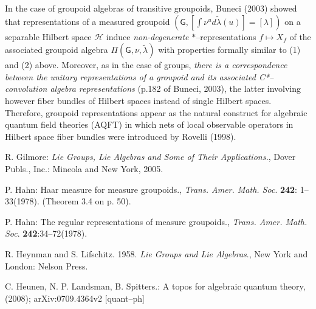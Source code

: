 \documentclass[12pt]{article}
\theoremstyle{plain}
\theoremstyle{definition}
\numberwithin{equation}{section}
\renewcommand{\H}{\mathcal H}
\newcommand{\grp}{{\mathsf{G}}}
\newcommand{\<}{{\langle}}
\begin{document}
 In the case of groupoid algebras of transitive groupoids, Buneci
(2003) showed that representations of a measured groupoid
$({\grp, [\int \nu ^u d \tilde{ \lambda}(u)]=[\lambda]})$ on a
separable Hilbert space $\H$ induce  \textit{non-degenerate}
$*$--representations  $f \mapsto  X_f$ of the associated groupoid
algebra $ \Pi (\grp, \nu,\tilde{\lambda})$ with properties
formally similar to (1) and (2) above.  Moreover, as in the case
of groups, \textit{there is a correspondence between the unitary
representations of a groupoid and its associated C*--convolution
algebra representations} (p.182 of Buneci, 2003), the latter
involving however fiber bundles of Hilbert spaces instead of
single Hilbert spaces. Therefore, groupoid representations appear
as the natural construct for algebraic quantum field theories (AQFT) in
which nets of local observable operators in Hilbert space fiber
bundles were introduced by Rovelli (1998).

\begin{thebibliography}{9}

R. Gilmore: \emph{Lie Groups, Lie Algebras and Some of Their Applications.},
Dover Publs., Inc.: Mineola and New York, 2005.

P. Hahn: Haar measure for measure groupoids., \textit{Trans. Amer. Math. Soc}. \textbf{242}: 1--33(1978).
(Theorem 3.4 on p. 50).

P. Hahn: The regular representations of measure groupoids., \textit{Trans. Amer. Math. Soc}. \textbf{242}:34--72(1978).

R. Heynman and S. Lifschitz. 1958. \emph{Lie Groups and Lie Algebras}., New York and London: Nelson Press.

C. Heunen, N. P. Landsman, B. Spitters.: A topos for algebraic quantum theory, (2008);
  arXiv:0709.4364v2 [quant--ph]

\end{thebibliography}
\end{document}
